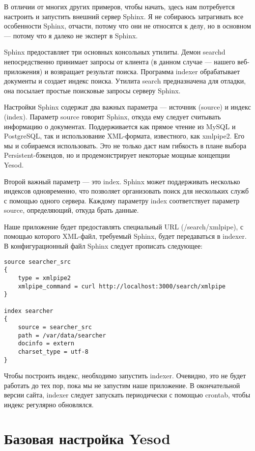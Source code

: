 В отличии от многих других примеров, чтобы начать, здесь нам потребуется настроить и запустить внешний сервер Sphinx. Я не собираюсь затрагивать все особенности Sphinx, отчасти, потому что они не относятся к делу, но в основном --- потому что я далеко не эксперт в Sphinx.

Sphinx предоставляет три основных консольных утилиты. Демон searchd непосредственно принимает запросы от клиента (в данном случае --- нашего веб-приложения) и возвращает результат поиска. Программа indexer обрабатывает документы и создает индекс поиска. Утилита search предназначена для отладки, она посылает простые поисковые запросы серверу Sphinx.

Настройки Sphinx содержат два важных параметра --- источник (source) и индекс (index). Параметр source говорит Sphinx, откуда ему следует считывать информацию о документах. Поддерживается как прямое чтение из MySQL и PostgreSQL, так и использование XML-формата, известного, как xmlpipe2. Его мы и собираемся использовать. Это не только даст нам гибкость в плане выбора Persistent-бэкендов, но и продемонстрирует некоторые мощные концепции Yesod.

Второй важный параметр --- это index. Sphinx может поддерживать несколько индексов одновременно, что позволяет организовать поиск для нескольких служб с помощью одного сервера. Каждому параметру index соответствует параметр source, определяющий, откуда брать данные.

Наше приложение будет предоставлять специальный URL (/search/xmlpipe), с помощью которого XML-файл, требуемый Sphinx, будет передаваться в indexer. В конфигурационный файл Sphinx следует прописать следующее:

\begin{lstlisting}
source searcher_src
{
    type = xmlpipe2
    xmlpipe_command = curl http://localhost:3000/search/xmlpipe
}

index searcher
{
    source = searcher_src
    path = /var/data/searcher
    docinfo = extern
    charset_type = utf-8
}
\end{lstlisting}

Чтобы построить индекс, необходимо запустить indexer. Очевидно, это не будет работать до тех пор, пока мы не запустим наше приложение.  В окончательной версии сайта, indexer следует запускать периодически с помощью crontab, чтобы индекс регулярно обновлялся.

\section{Базовая настройка Yesod} %

